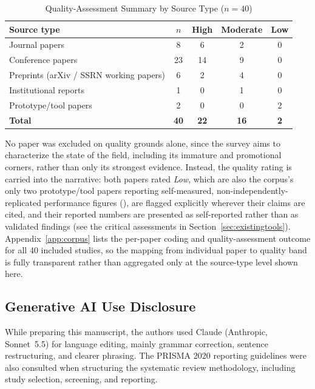 \documentclass[sn-basic,Numbered]{sn-jnl}
\begin{document}
\begin{table}[h]
\centering
\caption{Quality-Assessment Summary by Source Type ($n=40$)}
\label{tab:quality}
\renewcommand{\arraystretch}{1.15}
\begin{tabular}{|l|c|c|c|c|}
\hline
\textbf{Source type} & \textbf{$n$} & \textbf{High} & \textbf{Moderate} & \textbf{Low} \\
\hline
Journal papers & 8 & 6 & 2 & 0 \\
\hline
Conference papers & 23 & 14 & 9 & 0 \\
\hline
Preprints (arXiv / SSRN working papers) & 6 & 2 & 4 & 0 \\
\hline
Institutional reports & 1 & 0 & 1 & 0 \\
\hline
Prototype/tool papers & 2 & 0 & 0 & 2 \\
\hline
\textbf{Total} & \textbf{40} & \textbf{22} & \textbf{16} & \textbf{2} \\
\hline
\end{tabular}
\end{table}

No paper was excluded on quality grounds alone, since the survey aims
to characterize the state of the field, including its immature and
promotional corners, rather than only its strongest evidence. Instead,
the quality rating is carried into the narrative: both papers rated
\emph{Low}, which are also the corpus's only two prototype/tool papers
reporting self-measured, non-independently-replicated performance
figures (\cite{kunekar2025omnischolar,shanmuganan2025scholargenie}),
are flagged explicitly wherever their claims are cited, and their
reported numbers are presented as self-reported rather than as
validated findings (see the critical assessments in
Section~\ref{sec:existingtools}). Appendix~\ref{app:corpus} lists the
per-paper coding and quality-assessment outcome for all 40 included
studies, so the mapping from individual paper to quality band is fully
transparent rather than aggregated only at the source-type level shown
here.


\subsection{Generative AI Use Disclosure}

While preparing this manuscript, the authors used Claude (Anthropic, Sonnet~5.5) for language editing, mainly grammar correction, sentence restructuring, and clearer phrasing. The PRISMA 2020 reporting guidelines were also consulted when structuring the systematic review methodology, including study selection, screening, and reporting.
\end{document}

